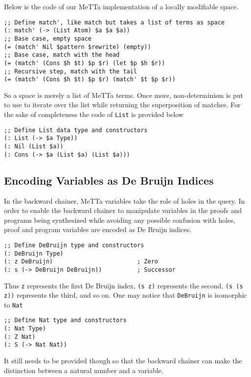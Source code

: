\documentclass[]{report}
\begin{document}
Below is the code of our MeTTa implementation of a locally modifiable
space.
\begin{verbatim}
;; Define match', like match but takes a list of terms as space
(: match' (-> (List Atom) $a $a $a))
;; Base case, empty space
(= (match' Nil $pattern $rewrite) (empty))
;; Base case, match with the head
(= (match' (Cons $h $t) $p $r) (let $p $h $r))
;; Recursive step, match with the tail
(= (match' (Cons $h $t) $p $r) (match' $t $p $r))
\end{verbatim}
So a space is merely a list of MeTTa terms.  Once more,
non-determinism is put to use to iterate over the list while returning
the superposition of matches.  For the sake of completeness the code
of \texttt{List} is provided below
\begin{verbatim}
;; Define List data type and constructors
(: List (-> $a Type))
(: Nil (List $a))
(: Cons (-> $a (List $a) (List $a)))
\end{verbatim}

\subsection{Encoding Variables as De Bruijn Indices}

In the backward chainer, MeTTa variables take the role of holes in the
query.  In order to enable the backward chainer to manipulate
variables in the proofs and programs being synthesized while avoiding
any possible confusion with holes, proof and program variables are
encoded as De Bruijn indices.
\begin{verbatim}
;; Define DeBruijn type and constructors
(: DeBruijn Type)
(: z DeBruijn)                        ; Zero
(: s (-> DeBruijn DeBruijn))          ; Successor
\end{verbatim}
Thus \texttt{z} represents the first De Bruijn index,
\texttt{(s z)} represents the second,
\texttt{(s (s z))} represents the third, and so on.  One
may notice that \texttt{DeBruijn} is isomorphic to
\texttt{Nat}
\begin{verbatim}
;; Define Nat type and constructors
(: Nat Type)
(: Z Nat)
(: S (-> Nat Nat))
\end{verbatim}
It still needs to be provided though so that the backward chainer can
make the distinction between a natural number and a variable.
\end{document}
